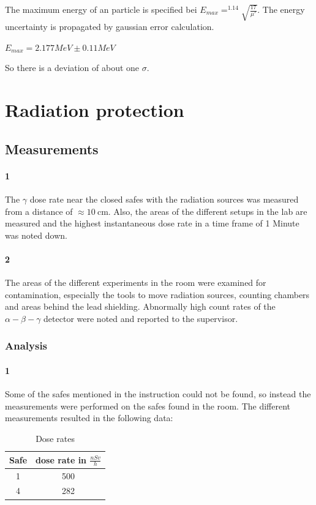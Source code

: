 \documentclass[12pt,twoside,a4paper]{scrartcl}
\begin{document}
        The maximum energy of an particle is specified bei $E_{max} = ^{1.14}\sqrt{\frac{17}{\mu'}}$.
        The energy uncertainty is propagated by gaussian error calculation.

        $E_{max} = 2.177 MeV \pm 0.11MeV$

        So there is a deviation of about one $\sigma$.

	\section{Radiation protection}

	\subsection{Measurements}
		\paragraph{1}
		The $\gamma$ dose rate near the closed safes with the radiation sources was measured from a distance of $\approx \SI{10}{\centi \metre}$.
		Also, the areas of the different setups in the lab are measured and the highest instantaneous dose rate in a time frame of 1 Minute was noted down.

		\paragraph{2}
			The areas of the different experiments in the room were examined for contamination, especially the tools to move radiation sources, counting chambers and areas behind the lead shielding. Abnormally high count rates of the $\alpha - \beta - \gamma$ detector were noted and reported to the supervisor.

	\subsubsection{Analysis}
		\paragraph{1}

			Some of the safes mentioned in the instruction could not be found, so instead the measurements were performed on the safes found in the room.
			The different measurements resulted in the following data:

			\begin{table}[H]
				\centering
				\caption{Dose rates}
				\label{Dose::safes}
				\begin{tabular}{|c|c|}
					\hline
					Safe & dose rate in $\frac{nSv}{h}$ \\
					\hline
					1		&		500 \\
					4		&		282 \\
					\hline
				\end{tabular}
			\end{table}
\end{document}
